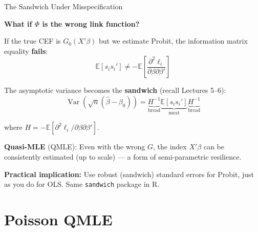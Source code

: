 \documentclass[aspectratio=169, handout, t]{beamer}
\numberwithin{equation}{section}
\begin{document}

\begin{frame}{The Sandwich Under Misspecification}

\textbf{What if $\Phi$ is the wrong link function?}

\pause

If the true CEF is $G_0(X'\beta)$ but we estimate Probit, the information matrix equality \textbf{fails}:
\[
\mathbb{E}[s_i s_i'] \neq -\mathbb{E}\!\left[\frac{\partial^2 \ell_i}{\partial \beta \partial \beta'}\right]
\]

\pause

The asymptotic variance becomes the \textbf{sandwich} (recall Lectures 5--6):
\[
\operatorname{Var}(\sqrt{n}(\hat\beta - \beta_0))
=
\underbrace{H^{-1}}_{\text{bread}}
\underbrace{\mathbb{E}[s_i s_i']}_{\text{meat}}
\underbrace{H^{-1}}_{\text{bread}}
\]

where $H = -\mathbb{E}[\partial^2 \ell_i / \partial\beta\partial\beta']$.

\pause

\textbf{Quasi-MLE} (QMLE): Even with the wrong $G$, the index $X'\beta$ can be consistently estimated (up to scale) --- a form of semi-parametric resilience.

\pause

\textbf{Practical implication:} Use robust (sandwich) standard errors for Probit, just as you do for OLS. Same \texttt{sandwich} package in R.

\end{frame}

\section{Poisson QMLE}
\end{document}
